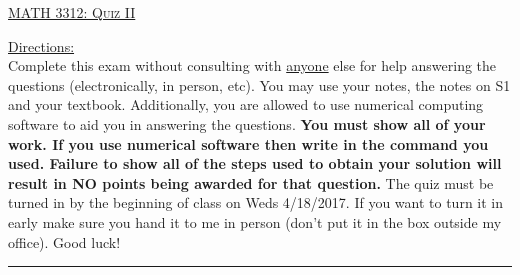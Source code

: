 \documentclass[10pt, a4paper]{article}
\theoremstyle{break}
\begin{document}
\begin{center}
{\large \textsc{\underline{MATH 3312: Quiz II}}}
\vspace{0.125in}
\end{center}
\underline{Directions:} \\
Complete this exam without consulting with \underline{anyone} else for help answering the questions (electronically, in person, etc). You may use your notes, the notes on S1 and your textbook. Additionally, you are allowed to use numerical computing software to aid you in answering the questions. \textbf{You must show all of your work. If you use numerical software then write in the command you used. Failure to show all of the steps used to obtain your solution will result in NO points being awarded for that question. } 
\noindent The quiz must be turned in by the beginning of class on Weds 4/18/2017. If you want to turn it in early make sure you hand it to me in person (don't put it in the box outside my office). Good luck! \\
\noindent\rule{15cm}{0.4pt}

\vspace{0.25in}
\end{document}
